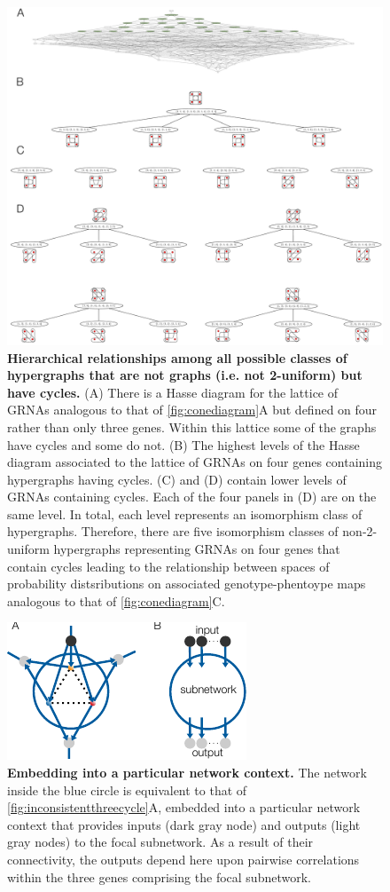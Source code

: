 \begin{figure}[!ht]
\centering
\noindent\includegraphics[width=1.0\columnwidth]{fig/non2uniformcyclichypergraphhasse.pdf}
\caption{{\bf Hierarchical relationships among all possible classes of hypergraphs that are not graphs (i.e. not 2-uniform) but have cycles.} (A) There is a Hasse diagram for the lattice of GRNAs analogous to that of \ref{fig:conediagram}A but defined on four rather than only three genes. Within this lattice some of the graphs have cycles and some do not. (B) The highest levels of the Hasse diagram associated to the lattice of GRNAs on four genes containing hypergraphs having cycles. (C) and (D) contain lower levels of GRNAs containing cycles. Each of the four panels in (D) are on the same level. In total, each level represents an isomorphism class of hypergraphs. Therefore, there are five isomorphism classes of non-2-uniform hypergraphs representing GRNAs on four genes that contain cycles leading to the relationship between spaces of probability distsributions on associated genotype-phentoype maps analogous to that of \ref{fig:conediagram}C.}
\label{fig:non2uniformcyclichypergraphhasse}
\end{figure}

\begin{figure}[!ht]
\centering
\noindent\includegraphics[width=0.3\columnwidth]{fig/controlnetwork.pdf}
\caption{{\bf Embedding into a particular network context.} The network inside the blue circle is equivalent to that of \ref{fig:inconsistentthreecycle}A, embedded into a particular network context that provides inputs (dark gray node) and outputs (light gray nodes) to the focal subnetwork. As a result of their connectivity, the outputs depend here upon pairwise correlations within the three genes comprising the focal subnetwork.}
\label{fig:controlnetwork}
\end{figure}
